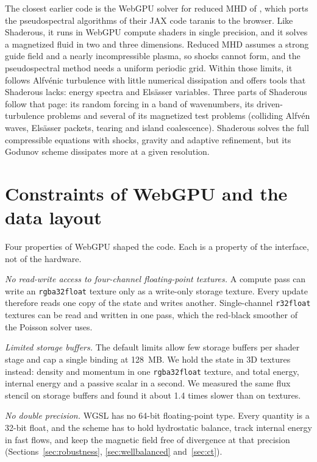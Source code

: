 \documentclass[twocolumn]{aastex701}
\begin{document}
The closest earlier code is the WebGPU solver for reduced MHD of \citet{Mallet2026}, which ports the pseudospectral algorithms of their JAX code taranis to the browser. Like Shaderous, it runs in WebGPU compute shaders in single precision, and it solves a magnetized fluid in two and three dimensions. Reduced MHD assumes a strong guide field and a nearly incompressible plasma, so shocks cannot form, and the pseudospectral method needs a uniform periodic grid. Within those limits, it follows Alfv\'enic turbulence with little numerical dissipation and offers tools that Shaderous lacks: energy spectra and Els\"asser variables. Three parts of Shaderous follow that page: its random forcing in a band of wavenumbers, its driven-turbulence problems and several of its magnetized test problems (colliding Alfv\'en waves, Els\"asser packets, tearing and island coalescence). Shaderous solves the full compressible equations with shocks, gravity and adaptive refinement, but its Godunov scheme dissipates more at a given resolution.

\section{Constraints of WebGPU and the data layout}
\label{sec:webgpu}

Four properties of WebGPU shaped the code. Each is a property of the interface, not of the hardware.

\emph{No read-write access to four-channel floating-point textures.} A compute pass can write an \texttt{rgba32float} texture only as a write-only storage texture. Every update therefore reads one copy of the state and writes another. Single-channel \texttt{r32float} textures can be read and written in one pass, which the red-black smoother of the Poisson solver uses.

\emph{Limited storage buffers.} The default limits allow few storage buffers per shader stage and cap a single binding at 128~MB. We hold the state in 3D textures instead: density and momentum in one \texttt{rgba32float} texture, and total energy, internal energy and a passive scalar in a second. We measured the same flux stencil on storage buffers and found it about 1.4 times slower than on textures.

\emph{No double precision.} WGSL has no 64-bit floating-point type. Every quantity is a 32-bit float, and the scheme has to hold hydrostatic balance, track internal energy in fast flows, and keep the magnetic field free of divergence at that precision (Sections~\ref{sec:robustness}, \ref{sec:wellbalanced} and~\ref{sec:ct}).
\end{document}
